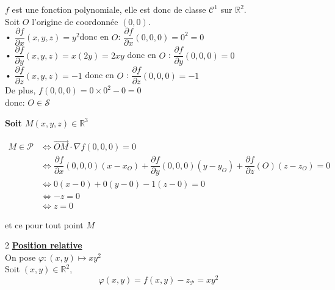 \documentclass{article}
\newcommand{\R}[0]{
\mathbb{R}
}
\newcommand{\xBox}[3]{
    \begin{thmbox}[M]{\textbf{#1}}
        #2\vspace*{5pt}
    \end{thmbox}\vspace*{-10pt}
    \hspace*{40pt} #3
}
\begin{document}
{$f$ est une fonction polynomiale, elle est donc de classe $\mathcal{C}^1$ sur $\R^2$.\\
Soit $O$ l'origine de coordonnée $(0,0)$.\\
• $\dfrac{\partial f}{\partial x}(x,y,z) = y^2$\quad donc en $O$: $\dfrac{\partial f}{\partial x}(0,0,0) = 0^2 = 0$\\
• $\dfrac{\partial f}{\partial y}(x,y,z) = x(2y) = 2xy$ \quad donc en $O$ : $\dfrac{\partial f}{\partial y}(0,0,0) = 0$\\
• $\dfrac{\partial f}{\partial z}(x,y,z) =-1$ \quad donc en $O$ : $\dfrac{\partial f}{\partial z}(0,0,0) = -1$\\
De plus, $f(0,0,0) = 0 \times 0^2 -0 = 0$\\
donc: $O \in \mathscr{S}$

\xBox{Soit $M(x,y,z) \in \R^3$}{
\begin{align*}
M \in \mathscr{P} &\iff \overrightarrow{OM} \cdot \nabla f(0,0,0) = 0\\
&\iff \dfrac{\partial f}{\partial x}(0,0,0)(x-x_O) + \dfrac{\partial f}{\partial y}(0,0,0)(y-y_O) + \dfrac{\partial f}{\partial z}(O)(z-z_O) = 0\\
&\iff 0(x-0) + 0(y-0) - 1(z-0) = 0\\
&\iff -z = 0\\
&\iff z = 0
\end{align*}}{et ce pour tout point $M$}
\begin{multicols}{2}
\noindent\underline{\textbf{Position relative}}\\
On pose $\varphi : (x,y) \mapsto xy^2$\\
Soit $(x,y) \in \R^2$,
$$\varphi(x,y) = f(x,y) - z_\mathscr{P} = xy^2$$


\end{multicols}}
\end{document}
